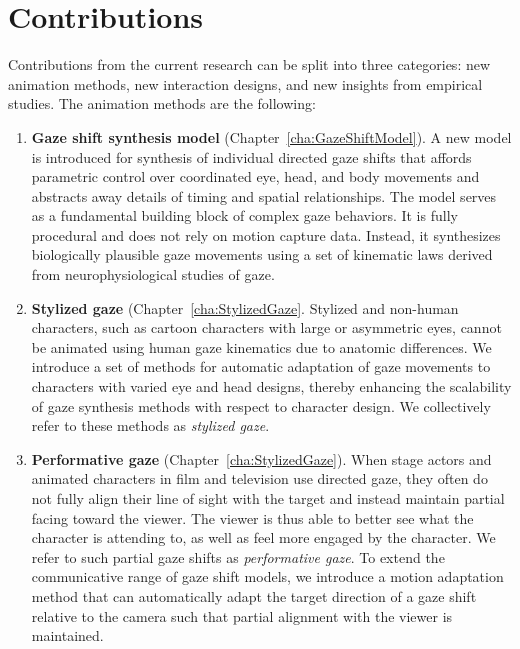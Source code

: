 \section{Contributions}

Contributions from the current research can be split into three categories: new animation methods, new interaction designs, and new insights from empirical studies. The animation methods are the following:

\begin{enumerate}
\item \textbf{Gaze shift synthesis model} (Chapter~\ref{cha:GazeShiftModel}). A new model is introduced for synthesis of individual directed gaze shifts that affords parametric control over coordinated eye, head, and body movements and abstracts away details of timing and spatial relationships. The model serves as a fundamental building block of complex gaze behaviors. It is fully procedural and does not rely on motion capture data. Instead, it synthesizes biologically plausible gaze movements using a set of kinematic laws derived from neurophysiological studies of gaze.
\item \textbf{Stylized gaze} (Chapter~\ref{cha:StylizedGaze}. Stylized and non-human characters, such as cartoon characters with large or asymmetric eyes, cannot be animated using human gaze kinematics due to anatomic differences. We introduce a set of methods for automatic adaptation of gaze movements to characters with varied eye and head designs, thereby enhancing the scalability of gaze synthesis methods with respect to character design. We collectively refer to these methods as \emph{stylized gaze}.
\item \textbf{Performative gaze} (Chapter~\ref{cha:StylizedGaze}). When stage actors and animated characters in film and television use directed gaze, they often do not fully align their line of sight with the target and instead maintain partial facing toward the viewer. The viewer is thus able to better see what the character is attending to, as well as feel more engaged by the character. We refer to such partial gaze shifts as \emph{performative gaze}. To extend the communicative range of gaze shift models, we introduce a motion adaptation method that can automatically adapt the target direction of a gaze shift relative to the camera such that partial alignment with the viewer is maintained.

\end{enumerate}
